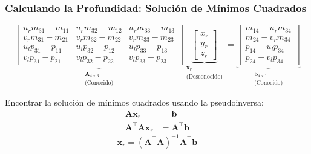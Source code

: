\begin{frame}
    \frametitle{Calculando la Profundidad: Solución de Mínimos Cuadrados}
    \begin{equation*}
        \underbrace{\begin{bmatrix}
            u_r m_{31} - m_{11} & u_r m_{32} - m_{12} & u_r m_{33} - m_{13} \\
            v_r m_{31} - m_{21} & v_r m_{32} - m_{22} & v_r m_{33} - m_{23} \\
            u_l p_{31} - p_{11} & u_l p_{32} - p_{12} & u_l p_{33} - p_{13} \\
            v_l p_{31} - p_{21} & v_l p_{32} - p_{22} & v_l p_{33} - p_{23}
        \end{bmatrix}}_{\substack{\mathbf{A}_{4\times3}\\ \text{(Conocido)}}}
        \underbrace{\begin{bmatrix} x_r \\ y_r \\ z_r \end{bmatrix}}_{\substack{\mathbf{x}_r\\ \text{(Desconocido)}}} =
        \underbrace{\begin{bmatrix}
            m_{14} - u_r m_{34} \\
            m_{24} - v_r m_{34} \\
            p_{14} - u_l p_{34} \\
            p_{24} - v_l p_{34}
        \end{bmatrix}}_{\substack{\mathbf{b}_{4\times1}\\ \text{(Conocido)}}}
    \end{equation*}

    Encontrar la solución de mínimos cuadrados usando la pseudoinversa:
    \begin{align*}
        \mathbf{A} \mathbf{x}_r &= \mathbf{b}\\
        \mathbf{A}^{\top} \mathbf{A} \mathbf{x}_r &= \mathbf{A}^{\top} \mathbf{b}
    \end{align*}
    \begin{equation*}
        \boxed{\mathbf{x}_r = (\mathbf{A}^{\top} \mathbf{A})^{-1} \mathbf{A}^{\top} \mathbf{b}}
    \end{equation*}
\end{frame}


